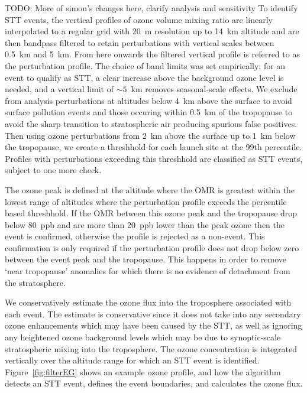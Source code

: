 \documentclass{article}
\begin{document}
    TODO: More of simon's changes here, clarify analysis and sensitivity
    To identify STT events, the vertical profiles of ozone volume mixing ratio are linearly interpolated to a regular grid with 20~m resolution up to 14~km altitude and are then bandpass filtered to retain perturbations with vertical scales between 0.5~km and 5~km.
    From here onwards the filtered vertical profile is referred to as the perturbation profile.
    The choice of band limits was set empirically; for an event to qualify as STT, a clear increase above the background ozone level is needed, and a vertical limit of $\sim 5$~km removes seasonal-scale effects.
    We exclude from analysis perturbations at altitudes below 4~km above the surface to avoid surface pollution events and those occuring within 0.5~km of the tropopause to avoid the sharp transition to stratospheric air producing spurious false positives.
    Then using ozone perturbations from 2~km above the surface up to 1~km below the tropopause, we create a threshhold for each launch site at the 99th percentile.
    Profiles with perturbations exceeding this threshhold are classified as STT events, subject to one more check.
    
    The ozone peak is defined at the altitude where the OMR is greatest within the lowest range of altitudes where the perturbation profile exceeds the percentile based threshhold.
    If the OMR between this ozone peak and the tropopause drop below 80~ppb and are more than 20~ppb lower than the peak ozone then the event is confirmed, otherwise the profile is rejected as a non-event.
    This confirmation is only required if the perturbation profile does not drop below zero between the event peak and the tropopause.
    This happens in order to remove `near tropopause' anomalies for which there is no evidence of detachment from the stratosphere.

    We conservatively estimate the ozone flux into the troposphere associated with each event.
    The estimate is conservative since it does not take into any secondary ozone enhancements which may have been caused by the STT, as well as ignoring any heightened ozone background levels which may be due to synoptic-scale stratospheric mixing into the troposphere.
    The ozone concentration is integrated vertically over the altitude range for which an STT event is identified.
    Figure~\ref{fig:filterEG} shows an example ozone profile, and how the algorithm detects an STT event, defines the event boundaries, and calculates the ozone flux.
    
\end{document}
